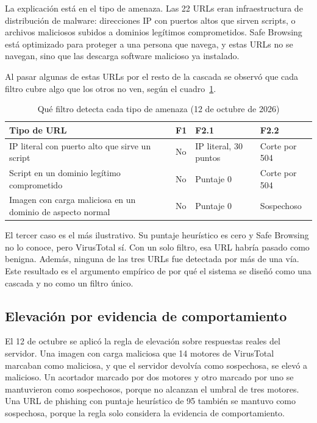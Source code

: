 La explicación está en el tipo de amenaza. Las 22 URLs eran infraestructura de distribución de malware: direcciones IP con puertos altos que sirven scripts, o archivos maliciosos subidos a dominios legítimos comprometidos. Safe Browsing está optimizado para proteger a una persona que navega, y estas URLs no se navegan, sino que las descarga software malicioso ya instalado.

Al pasar algunas de estas URLs por el resto de la cascada se observó que cada filtro cubre algo que los otros no ven, según el cuadro~\ref{tab:cobertura}.

\begin{table}[H]
	\centering
	\caption{Qué filtro detecta cada tipo de amenaza (12 de octubre de 2026)}
	\label{tab:cobertura}
	\small
	\begin{tabular}{@{}>{\raggedright\arraybackslash}p{4.8cm}>{\raggedright\arraybackslash}p{1.6cm}>{\raggedright\arraybackslash}p{2.8cm}>{\raggedright\arraybackslash}p{3.2cm}@{}}
		\toprule
		\textbf{Tipo de URL} & \textbf{F1} & \textbf{F2.1} & \textbf{F2.2} \\
		\midrule
		IP literal con puerto alto que sirve un script & No & IP literal, 30 puntos & Corte por 504 \\
		Script en un dominio legítimo comprometido & No & Puntaje 0 & Corte por 504 \\
		Imagen con carga maliciosa en un dominio de aspecto normal & No & Puntaje 0 & Sospechoso \\
		\bottomrule
	\end{tabular}
\end{table}

El tercer caso es el más ilustrativo. Su puntaje heurístico es cero y Safe Browsing no lo conoce, pero VirusTotal sí. Con un solo filtro, esa URL habría pasado como benigna. Además, ninguna de las tres URLs fue detectada por más de una vía. Este resultado es el argumento empírico de por qué el sistema se diseñó como una cascada y no como un filtro único.

\subsection{Elevación por evidencia de comportamiento}

El 12 de octubre se aplicó la regla de elevación sobre respuestas reales del servidor. Una imagen con carga maliciosa que 14 motores de VirusTotal marcaban como maliciosa, y que el servidor devolvía como sospechosa, se elevó a malicioso. Un acortador marcado por dos motores y otro marcado por uno se mantuvieron como sospechosos, porque no alcanzan el umbral de tres motores. Una URL de phishing con puntaje heurístico de 95 también se mantuvo como sospechosa, porque la regla solo considera la evidencia de comportamiento.

